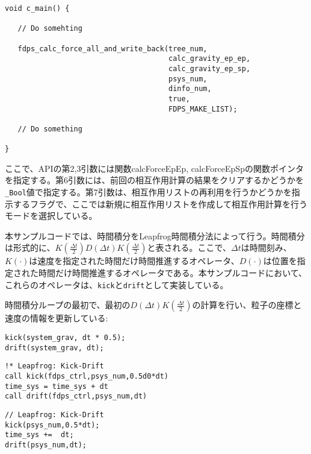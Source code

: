 \endifFtn
\ifC%
\begin{lstlisting}[caption=相互作用計算の実行]
void c_main() {
   
   // Do somehting
   
   fdps_calc_force_all_and_write_back(tree_num,
                                      calc_gravity_ep_ep,
                                      calc_gravity_ep_sp,
                                      psys_num,
                                      dinfo_num,
                                      true,
                                      FDPS_MAKE_LIST);

   // Do something

}
\end{lstlisting}
ここで、APIの第2,3引数には関数calcForceEpEp, calcForceEpSpの関数ポインタを指定する。第6引数には、前回の相互作用計算の結果をクリアするかどうかを\texttt{\_Bool}値で指定する。第7引数は、相互作用リストの再利用を行うかどうかを指示するフラグで、ここでは新規に相互作用リストを作成して相互作用計算を行うモードを選択している。
\endifC


 \label{s4sec:nbody_time_integration}
本サンプルコードでは、時間積分をLeapfrog時間積分法によって行う。時間積分は形式的に、$K(\frac{\Delta t}{2})D(\Delta t)K(\frac{\Delta t}{2})$と表される。ここで、$\Delta t$は時間刻み、$K(\cdot)$は速度を指定された時間だけ時間推進するオペレータ、$D(\cdot)$は位置を指定された時間だけ時間推進するオペレータである。本サンプルコードにおいて、これらのオペレータは、\procedure \texttt{kick}と\procedure \texttt{drift}として実装している。

時間積分ループの最初で、最初の$D(\Delta t)K(\frac{\Delta t}{2})$の計算を行い、粒子の座標と速度の情報を更新している:
\ifCpp%
\begin{lstlisting}[caption=$D(\Delta t)K(\frac{\Delta t}{2})$オペレータの計算]
kick(system_grav, dt * 0.5);
drift(system_grav, dt);
\end{lstlisting}
\endifCpp
\ifFtn%
\begin{lstlisting}[caption=$D(\Delta t)K(\frac{\Delta t}{2})$オペレータの計算]
!* Leapfrog: Kick-Drift
call kick(fdps_ctrl,psys_num,0.5d0*dt)
time_sys = time_sys + dt
call drift(fdps_ctrl,psys_num,dt)
\end{lstlisting}
\endifFtn
\ifC%
\begin{lstlisting}[caption=$D(\Delta t)K(\frac{\Delta t}{2})$オペレータの計算]
// Leapfrog: Kick-Drift
kick(psys_num,0.5*dt);
time_sys +=  dt;
drift(psys_num,dt);
\end{lstlisting}
\endifFtn


